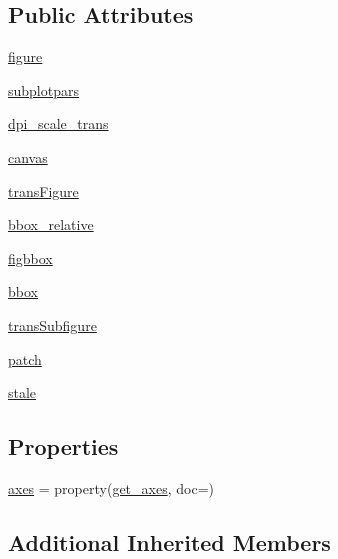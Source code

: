 \subsection*{Public Attributes}
\begin{DoxyCompactItemize}
\item 
\hyperlink{classmatplotlib_1_1figure_1_1SubFigure_a944503cf9515f39b935fd1e36df21ec0}{figure}
\item 
\hyperlink{classmatplotlib_1_1figure_1_1SubFigure_a7412ac034b30baef983e8d705af4addc}{subplotpars}
\item 
\hyperlink{classmatplotlib_1_1figure_1_1SubFigure_a519a8382af9e4dce10aab22c44312aef}{dpi\+\_\+scale\+\_\+trans}
\item 
\hyperlink{classmatplotlib_1_1figure_1_1SubFigure_a629124a72b87adde00af9e1400c9d2b4}{canvas}
\item 
\hyperlink{classmatplotlib_1_1figure_1_1SubFigure_a5dc3e9de8cbda4dc517d024dfa86a7bd}{trans\+Figure}
\item 
\hyperlink{classmatplotlib_1_1figure_1_1SubFigure_a13982770991ebc12df2d438d157f3981}{bbox\+\_\+relative}
\item 
\hyperlink{classmatplotlib_1_1figure_1_1SubFigure_aa64005a8a0145e3473a64e3abee74201}{figbbox}
\item 
\hyperlink{classmatplotlib_1_1figure_1_1SubFigure_a933fa724a79eed50175f51b32051deb9}{bbox}
\item 
\hyperlink{classmatplotlib_1_1figure_1_1SubFigure_adb667a351540337d7df3e73cc0ba5c52}{trans\+Subfigure}
\item 
\hyperlink{classmatplotlib_1_1figure_1_1SubFigure_a3cc30deea21bd00c42ac85dc64081adc}{patch}
\item 
\hyperlink{classmatplotlib_1_1figure_1_1SubFigure_a8e8c6a1f334baafaa11b73b80583a12c}{stale}
\end{DoxyCompactItemize}
\subsection*{Properties}
\begin{DoxyCompactItemize}
\item 
\hyperlink{classmatplotlib_1_1figure_1_1SubFigure_a22811119cafa5097791ece96e30fbb67}{axes} = property(\hyperlink{classmatplotlib_1_1figure_1_1SubFigure_ad68fb8445ae699f76a7e98b6e60b4aa4}{get\+\_\+axes}, doc=)
\end{DoxyCompactItemize}
\subsection*{Additional Inherited Members}


